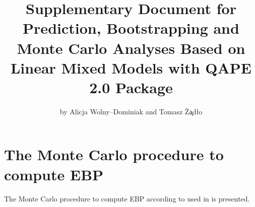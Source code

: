 \title{Supplementary Document for \\ Prediction, Bootstrapping and Monte Carlo Analyses Based on Linear Mixed Models with QAPE 2.0 Package}
\author{by Alicja Wolny--Dominiak and Tomasz \.{Z}\c{a}d{\l}o}

\maketitle             %

	
	
	
	
	
	
	

\section*{The Monte Carlo procedure to compute EBP}
The Monte Carlo procedure to compute EBP according to \cite{molina2010small} used in  is presented.

